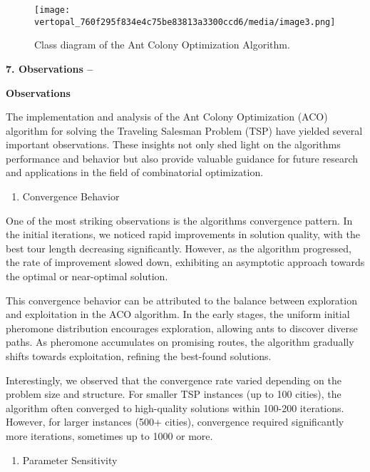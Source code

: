 \documentclass[
]{article}
\begin{document}
\begin{figure}[htbp]
\centering
\texttt{[image: vertopal\_760f295f834e4c75be83813a3300ccd6/media/image3.png]}
\caption{Class diagram of the Ant Colony Optimization Algorithm. \label{fig:my_label}}
\end{figure}

\textbf{7. Observations --}

\textbf{Observations}

The implementation and analysis of the Ant Colony Optimization (ACO)
algorithm for solving the Traveling Salesman Problem (TSP) have yielded
several important observations. These insights not only shed light on
the algorithm\textquotesingle s performance and behavior but also
provide valuable guidance for future research and applications in the
field of combinatorial optimization.

\begin{enumerate}
\def\labelenumi{\arabic{enumi}.}
\item
  Convergence Behavior
\end{enumerate}

One of the most striking observations is the algorithm\textquotesingle s
convergence pattern. In the initial iterations, we noticed rapid
improvements in solution quality, with the best tour length decreasing
significantly. However, as the algorithm progressed, the rate of
improvement slowed down, exhibiting an asymptotic approach towards the
optimal or near-optimal solution.

This convergence behavior can be attributed to the balance between
exploration and exploitation in the ACO algorithm. In the early stages,
the uniform initial pheromone distribution encourages exploration,
allowing ants to discover diverse paths. As pheromone accumulates on
promising routes, the algorithm gradually shifts towards exploitation,
refining the best-found solutions.

Interestingly, we observed that the convergence rate varied depending on
the problem size and structure. For smaller TSP instances (up to 100
cities), the algorithm often converged to high-quality solutions within
100-200 iterations. However, for larger instances (500+ cities),
convergence required significantly more iterations, sometimes up to 1000
or more.

\begin{enumerate}
\def\labelenumi{\arabic{enumi}.}
\setcounter{enumi}{1}
\item
  Parameter Sensitivity
\end{enumerate}
\end{document}
